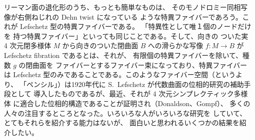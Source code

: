 \documentclass[uplatex,dvipdfmx]{jlreq}
\begin{document}
\bigskip

リーマン面の退化形のうち、もっとも簡単なものは、
そのモノドロミー同相写像が右側ねじれの Dehn twist になっている
ような特異ファイバーであろう。これが Lefschetz 型の特異ファイバーである。
「特異性として唯１個のノードだけを
持つ特異ファイバー」といっても同じことである。そして、向きの
ついた実 4 次元閉多様体 $M$ から向きのついた閉曲面 $B$ への滑らかな写像
$f: M \to B$ が Lefschetz fibration であるとは、それが、
有限個の特異ファイバーを除いて、種数 $g$ の閉曲面を
ファイバーとするファイバー束になっており、特異ファイバーは
Lefschetz 型のみであることである。このようなファイバー空間（というより、
「ペンシル」）は1920年代に S.~Lefschetz が代数曲面の位相的研究の補助手段として
導入したものであるが、最近、それが 4 次元シンプレクティック多様体
に適合した位相的構造であることが証明され（Donaldson、Gompf）、
多くの人々の注目するところとなった。いろいろな人がいろいろな研究を
していて、とてもそれらを紹介する能力はないが、
面白いと思われるいくつかの結果を紹介したい。
\end{document}
